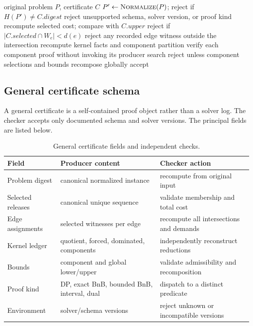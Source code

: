 \documentclass[10pt,conference]{IEEEtran}
\newcommand{\suppTableFont}{\footnotesize}
\begin{document}
\begin{algorithm}[t]
\caption{Independent replay of a general certificate}
\begin{algorithmic}[1]
\Require original problem $P$, certificate $C$
\State $P'\gets\textsc{Normalize}(P)$; reject if $H(P')\ne C.\mathit{digest}$
\State reject unsupported schema, solver version, or proof kind
\State recompute selected cost; compare with $C.\mathit{upper}$
  \State reject if $|C.\mathit{selected}\cap W_e|<d(e)$
  \State reject any recorded edge witness outside the intersection
\EndFor
\State recompute kernel facts and component partition
\State verify each component proof without invoking its producer search
\State reject unless component selections and bounds recompose globally
\State \Return accept
\end{algorithmic}
\end{algorithm}


\subsection{General certificate schema}
A general certificate is a self-contained proof object rather than a solver log. The checker accepts only documented schema and solver versions. The principal fields are listed below.

\begin{table}[t]
\centering
\caption{General certificate fields and independent checks.}
\suppTableFont
\begin{tabularx}{\columnwidth}{p{1.45cm}p{2.0cm}X}
\toprule
Field & Producer content & Checker action \\
\midrule
Problem digest & canonical normalized instance & recompute from original input \\
Selected releases & canonical unique sequence & validate membership and total cost \\
Edge assignments & selected witnesses per edge & recompute all intersections and demands \\
Kernel ledger & quotient, forced, dominated, components & independently reconstruct reductions \\
Bounds & component and global lower/upper & validate admissibility and recomposition \\
Proof kind & DP, exact BnB, bounded BnB, interval, dual & dispatch to a distinct predicate \\
Environment & solver/schema versions & reject unknown or incompatible versions \\
\bottomrule
\end{tabularx}
\end{table}
\end{document}
